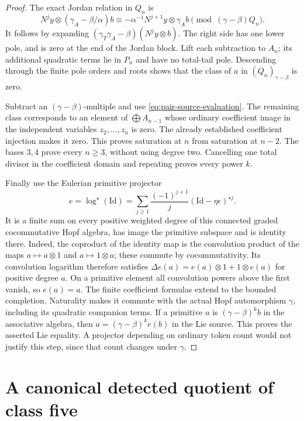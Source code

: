\documentclass[11pt]{article}
\theoremstyle{definition}\newtheorem{definition}[theorem]{Definition}
\begin{document}
\begin{proof}
The exact Jordan relation in $Q_n$ is
\begin{equation}\label{eq:pair-Jordan-reduction}
 N^jy\otimes(\gamma_A-\beta/\alpha)b
 \equiv-\alpha^{-1}N^{j+1}y\otimes\gamma_A b
                                  \pmod{(\gamma-\beta)Q_n}.
\end{equation}
It follows by expanding
$(\gamma_T\gamma_A-\beta)(N^jy\otimes b)$.
The right side has one lower pole, and is zero at
the end of the Jordan block. Lift each subtraction
to $A_n$; its additional quadratic terms lie in
$P_n$ and have no total-tail pole. Descending through
the finite pole orders and roots shows that the
class of $a$ in $(Q_n)_{\gamma-\beta}$ is zero.

Subtract an $(\gamma-\beta)$-multiple and use
\eqref{eq:pair-source-evaluation}. The remaining
class corresponds to an element of
$\bigoplus A_{n-1}$ whose ordinary coefficient image
in the independent variables $z_2,\ldots,z_n$ is zero.
The already established coefficient injection makes
it zero. This proves saturation at $n$ from saturation
at $n-2$. The bases $3,4$ prove every $n\geq3$,
without using degree two. Cancelling one total
divisor in the coefficient domain and repeating
proves every power $k$.

Finally use the Eulerian primitive projector
\cite[Section~1.1, p.~2]{BandieraSchaetz}
\[
 e=\log^\star(\mathrm{Id})
   =\sum_{j\geq1}\frac{(-1)^{j+1}}j
             (\mathrm{Id}-\eta\epsilon)^{\star j}.
\]
It is a finite sum on every positive weighted degree
of this connected graded cocommutative Hopf algebra,
has image the primitive subspace and is identity
there. Indeed, the coproduct of the identity map is
the convolution product of the maps $a\mapsto a\otimes1$
and $a\mapsto1\otimes a$; these commute by cocommutativity.
Its convolution logarithm therefore satisfies
$\Delta e(a)=e(a)\otimes1+1\otimes e(a)$ for positive
degree $a$. On a primitive element all convolution
powers above the first vanish, so $e(a)=a$.
The finite coefficient formulas extend to the bounded
completion. Naturality makes it commute with the actual
Hopf automorphism $\gamma$, including its quadratic
companion terms. If a primitive $a$ is
$(\gamma-\beta)^k b$ in the associative algebra,
then $a=(\gamma-\beta)^k e(b)$ in the Lie source.
This proves the asserted Lie equality. A projector
depending on ordinary token count would not justify
this step, since that count changes under $\gamma$.
\end{proof}

\section{A canonical detected quotient of class five}
\label{sec:canonical-class-five}
\end{document}
